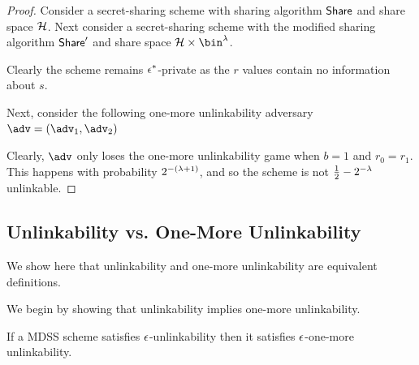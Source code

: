 \begin{proof}
	Consider a secret-sharing scheme with sharing algorithm $\mathsf{Share}$ and share space $\mathcal{H}$.
	Next consider a secret-sharing scheme with the modified sharing algorithm $\mathsf{Share}'$ and share space $\mdssShareSpace \times \bin^{\secpar}$.

	Clearly the scheme remains $\epsilon^*$-private as the $r$ values contain no information about $s$.

	Next, consider the following one-more unlinkability adversary $\adv = (\adv_1, \adv_2)$
	\begin{pchstack}[center, space=1em]

	\end{pchstack}
	Clearly, $\adv$ only loses the one-more unlinkability game when $b = 1$ and $r_0 = r_1$.
	This happens with probability $2^{-(\lambda + 1)}$, and so the scheme is not $\frac{1}{2} - 2^{-\lambda}$ unlinkable.
\end{proof}

\subsection{Unlinkability vs. One-More Unlinkability}

We show here that unlinkability and one-more unlinkability are equivalent definitions.

We begin by showing that unlinkability implies one-more unlinkability.
\begin{theorem}
	If a MDSS scheme satisfies $\epsilon$-unlinkability then it satisfies $\epsilon$-one-more unlinkability.
\end{theorem}

